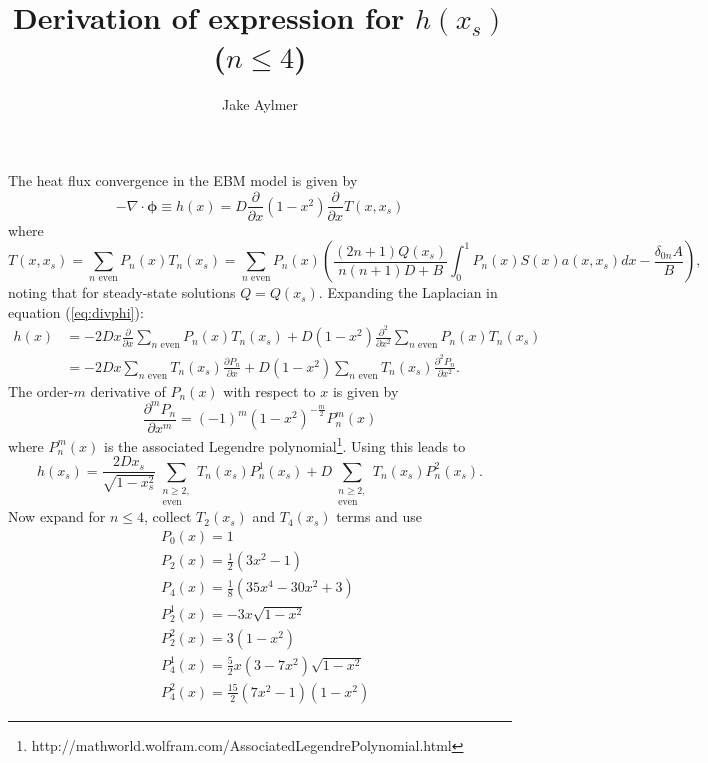 \documentclass[12pt]{article}
\begin{document}
\thispagestyle{empty}

\title{Derivation of expression for $h(x_s)$ ($n \leq 4$)}
\author{Jake Aylmer}
\maketitle

\normalsize
\noindent
The heat flux convergence in the EBM model is given by
\begin{equation}\label{eq:divphi}
-\nabla \cdot \bm{\phi} \equiv h(x) = D\frac{\partial}{\partial x}\left( 1 - x^2 \right) \frac{\partial}{\partial x} T(x,x_s)
\end{equation}
where
\begin{equation*}
T(x, x_s) = \sum_{n \textrm{ even}} P_n(x)T_n(x_s) = \sum_{n \textrm{ even}} P_n(x)\left( \frac{(2n+1)Q(x_s)}{n(n+1)D+B}\int_0^1 P_n(x)S(x)a(x,x_s) dx - \frac{\delta_{0n}A}{B}\right),
\end{equation*}
noting that for steady-state solutions $Q=Q(x_s)$. Expanding the Laplacian in equation (\ref{eq:divphi}):
\begin{align*}
h(x) &= -2Dx\frac{\partial}{\partial x}\sum_{n\textrm{ even}}P_n(x)T_n(x_s) + D(1-x^2)\frac{\partial^2}{\partial x^2}\sum_{n\textrm{ even}}P_n(x)T_n(x_s) \\
&= -2Dx\sum_{n\textrm{ even}}T_n(x_s)\frac{\partial P_n}{\partial x} + D(1-x^2)\sum_{n\textrm{ even}}T_n(x_s)\frac{\partial^2P_n}{\partial x^2}.
\end{align*}
The order-$m$ derivative of $P_n(x)$ with respect to $x$ is given by
\begin{equation}
\frac{\partial^mP_n}{\partial x^m} = (-1)^m(1-x^2)^{-\frac{m}{2}}P_n^m(x)
\end{equation}
where $P_n^m(x)$ is the associated Legendre polynomial\footnote{http://mathworld.wolfram.com/AssociatedLegendrePolynomial.html}. Using this leads to
\begin{equation}
h(x_s) = \frac{2Dx_s}{\sqrt{1-x_s^2}}\sum_{\substack{n\geq 2, \\ \textrm{even}}}T_n(x_s)P_n^1(x_s) + D\sum_{\substack{n\geq 2, \\ \textrm{even}}}T_n(x_s)P_n^2(x_s).
\end{equation}
Now expand for $n\leq 4$, collect $T_2(x_s)$ and $T_4(x_s)$ terms and use
\begin{align*}
&P_0(x) = 1\\
&P_2(x) = \frac{1}{2}(3x^2-1)\\
&P_4(x) = \frac{1}{8}(35x^4 - 30x^2 + 3)\\
&P_2^1(x) = -3x\sqrt{1-x^2}\\
&P_2^2(x) = 3(1-x^2)\\
&P_4^1(x) = \frac{5}{2}x(3-7x^2)\sqrt{1-x^2}\\
&P_4^2(x) = \frac{15}{2}(7x^2-1)(1-x^2)
\end{align*}
\end{document}
